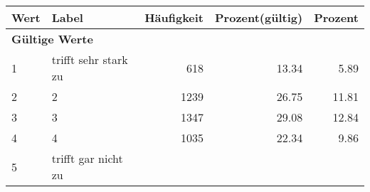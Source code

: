      \begin{longtable}{lXrrr}
     \toprule
     \textbf{Wert} & \textbf{Label} & \textbf{Häufigkeit} & \textbf{Prozent(gültig)} & \textbf{Prozent} \\
     \endhead
     \midrule
     \multicolumn{5}{l}{\textbf{Gültige Werte}}\\

     1 &
     \multicolumn{1}{X}{ trifft sehr stark zu   } &


       \num{618} &
       \num[round-mode=places,round-precision=2]{13.34} &
         \num[round-mode=places,round-precision=2]{5.89} \\

     2 &
     \multicolumn{1}{X}{ 2   } &


       \num{1239} &
       \num[round-mode=places,round-precision=2]{26.75} &
         \num[round-mode=places,round-precision=2]{11.81} \\

     3 &
     \multicolumn{1}{X}{ 3   } &


       \num{1347} &
       \num[round-mode=places,round-precision=2]{29.08} &
         \num[round-mode=places,round-precision=2]{12.84} \\

     4 &
     \multicolumn{1}{X}{ 4   } &


       \num{1035} &
       \num[round-mode=places,round-precision=2]{22.34} &
         \num[round-mode=places,round-precision=2]{9.86} \\

     5 &
     \multicolumn{1}{X}{ trifft gar nicht zu   } &



\end{longtable}
